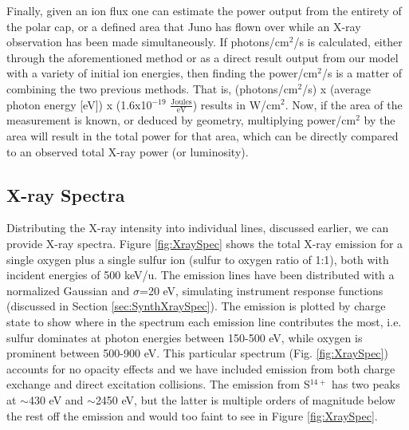 \documentclass[draft]{agujournal2018}
\begin{document}
Finally, given an ion flux one can estimate the power output from the entirety of the polar cap, or a defined area that Juno has flown over while an X-ray observation has been made simultaneously.
If photons/cm$^2$/s is calculated, either through the aforementioned method or as a direct result output from our model with a variety of initial ion energies, then finding the power/cm$^2$/s is a matter of combining the two  previous methods.
That is, (photons/cm$^2$/s) x (average photon energy [eV]) x (1.6x10$^{-19}$ $\frac{\mathrm{Joules}}{\mathrm{eV}}$) results in W/cm$^2$.
Now, if the area of the measurement is known, or deduced by geometry, multiplying power/cm$^2$ by the area will result in the total power for that area, which can be directly compared to an observed total X-ray power (or luminosity).

\subsection{X-ray Spectra}
\label{sec:XraySpec}

Distributing the X-ray intensity into individual lines, discussed earlier, we can provide X-ray spectra.
Figure \ref{fig:XraySpec} shows the total X-ray emission for a single oxygen plus a single sulfur ion (sulfur to oxygen ratio of 1:1), both with incident energies of 500 keV/u.
The emission lines have been distributed with a normalized Gaussian and $\sigma$=20 eV, simulating instrument response functions (discussed in Section \ref{sec:SynthXraySpec}).
The emission is plotted by charge state to show where in the spectrum each emission line contributes the most, i.e. sulfur dominates at photon energies between 150-500 eV, while oxygen is prominent between 500-900 eV.
This particular spectrum (Fig. \ref{fig:XraySpec}) accounts for no opacity effects and we have included emission from both charge exchange and direct excitation collisions.
The emission from S$^{14+}$ has two peaks at $\sim$430 eV and $\sim$2450 eV, but the latter is multiple orders of magnitude below the rest off the emission and would too faint to see in Figure \ref{fig:XraySpec}.
\end{document}
